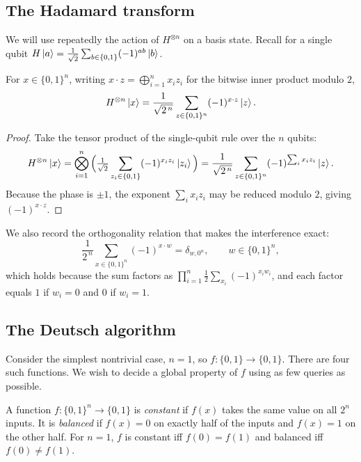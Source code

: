 \subsection{The Hadamard transform}

We will use repeatedly the action of $H^{\otimes n}$ on a basis state. Recall for
a single qubit $H\ket{a}=\tfrac{1}{\sqrt2}\sum_{b\in\{0,1\}}(-1)^{ab}\ket{b}$.

\begin{lemma}
\label{lem:lec03-had}
For $x\in\{0,1\}^n$, writing $x\cdot z=\bigoplus_{i=1}^{n}x_i z_i$ for the bitwise
inner product modulo $2$,
\[
  H^{\otimes n}\ket{x}=\frac{1}{\sqrt{2^{\,n}}}\sum_{z\in\{0,1\}^n}(-1)^{x\cdot z}\ket{z}.
\]
\end{lemma}

\begin{proof}
Take the tensor product of the single-qubit rule over the $n$ qubits:
\[
  H^{\otimes n}\ket{x}
  =\bigotimes_{i=1}^{n}\Big(\tfrac{1}{\sqrt2}\sum_{z_i\in\{0,1\}}(-1)^{x_i z_i}\ket{z_i}\Big)
  =\frac{1}{\sqrt{2^{\,n}}}\sum_{z\in\{0,1\}^n}(-1)^{\sum_i x_i z_i}\ket{z}.
\]
Because the phase is $\pm1$, the exponent $\sum_i x_i z_i$ may be reduced modulo
$2$, giving $(-1)^{x\cdot z}$.
\end{proof}

We also record the orthogonality relation that makes the interference exact:
\begin{equation}
  \frac{1}{2^{\,n}}\sum_{x\in\{0,1\}^n}(-1)^{x\cdot w}
  =\delta_{w,0^n},
  \qquad w\in\{0,1\}^n,
  \label{eq:lec03-orthog}
\end{equation}
which holds because the sum factors as $\prod_{i=1}^{n}\tfrac12\sum_{x_i}(-1)^{x_i w_i}$,
and each factor equals $1$ if $w_i=0$ and $0$ if $w_i=1$.

\subsection{The Deutsch algorithm}

Consider the simplest nontrivial case, $n=1$, so $f:\{0,1\}\to\{0,1\}$. There are
four such functions. We wish to decide a global property of $f$ using as few
queries as possible.

\begin{definition}
\label{def:lec03-constbal}
A function $f:\{0,1\}^n\to\{0,1\}$ is \emph{constant} if $f(x)$ takes the same
value on all $2^n$ inputs. It is \emph{balanced} if $f(x)=0$ on exactly half of
the inputs and $f(x)=1$ on the other half. For $n=1$, $f$ is constant iff
$f(0)=f(1)$ and balanced iff $f(0)\neq f(1)$.
\end{definition}

